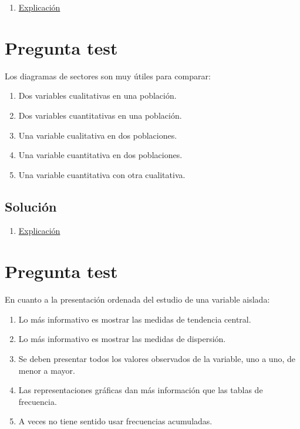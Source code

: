 \documentclass[
]{book}
\providecommand{\tightlist}{%
  \setlength{\itemsep}{0pt}\setlength{\parskip}{0pt}}
\begin{document}
\begin{enumerate}
\def\labelenumi{\alph{enumi})}
\tightlist
\item
  \href{https://1fjmanzano.github.io/bioestadistica/medidas-de-posicio\%CC\%81n-dispersio\%CC\%81n-y-forma.html\#medidas-de-posicio\%CC\%81n-centrales}{Explicación}
\end{enumerate}

\hypertarget{pregunta-test-18}{%
\section{Pregunta test}\label{pregunta-test-18}}

Los diagramas de sectores son muy útiles para comparar:

\begin{enumerate}
\def\labelenumi{\alph{enumi})}
\tightlist
\item
  Dos variables cualitativas en una población.
\item
  Dos variables cuantitativas en una población.
\item
  Una variable cualitativa en dos poblaciones.
\item
  Una variable cuantitativa en dos poblaciones.
\item
  Una variable cuantitativa con otra cualitativa.
\end{enumerate}

\hypertarget{soluciuxf3n-18}{%
\subsection{Solución}\label{soluciuxf3n-18}}

\begin{enumerate}
\def\labelenumi{\alph{enumi})}
\setcounter{enumi}{2}
\tightlist
\item
  \href{https://1fjmanzano.github.io/bioestadistica/diagramas-de-barras-y-sectores.html}{Explicación}
\end{enumerate}

\hypertarget{pregunta-test-19}{%
\section{Pregunta test}\label{pregunta-test-19}}

En cuanto a la presentación ordenada del estudio de una variable aislada:

\begin{enumerate}
\def\labelenumi{\alph{enumi})}
\tightlist
\item
  Lo más informativo es mostrar las medidas de tendencia central.
\item
  Lo más informativo es mostrar las medidas de dispersión.
\item
  Se deben presentar todos los valores observados de la variable, uno a uno, de menor a mayor.
\item
  Las representaciones gráficas dan más información que las tablas de frecuencia.
\item
  A veces no tiene sentido usar frecuencias acumuladas.
\end{enumerate}
\end{document}
